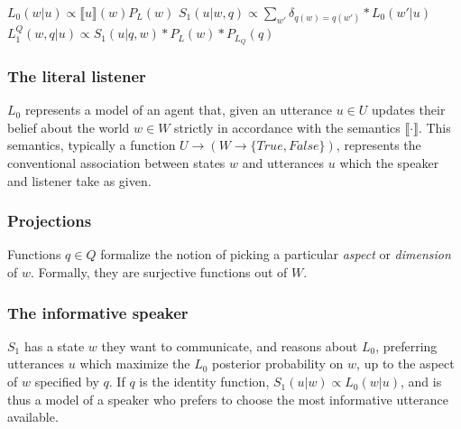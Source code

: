 \documentclass[OpenMind]{stjour}
\newcommand{\Listener}{L}
\newcommand{\QLONE}{\Listener_{{1}}^{{Q}}}
\begin{document}

	\begin{exe}
	\ex $L_0(w\vert u) \propto \llbracket u \rrbracket (w) P_L(w)$ \label{defl0}
	\ex $S_1(u\vert w,q) \propto \sum_{w'} \delta_{q(w)=q(w')} * L_0(w'\vert u)$ \label{defs0}
	\ex $\QLONE(w,q\vert u) \propto S_1(u\vert q,w)*P_L(w) * P_{L_Q}(q)$ \label{defl1}
	\end{exe}

	\subsubsection{The literal listener} $L_0$ represents a model of an agent that, given an utterance $u\in U$ updates their belief about the world $w\in W$ strictly in accordance with the semantics $\llbracket\cdot\rrbracket$. This semantics, typically a function $U\to(W\to\{True, False\})$, represents the conventional association between states $w$ and utterances $u$ which the speaker and listener take as given. 



	\subsubsection{Projections} 
	Functions $q\in Q$ formalize the notion of picking a particular \emph{aspect} or \emph{dimension} of $w$. Formally, they are surjective functions out of $W$.
	

	\subsubsection{The informative speaker} $S_1$ has a state $w$ they want to communicate, and reasons about $L_0$, preferring utterances $u$ which maximize the $L_0$ posterior probability on $w$, up to the aspect of $w$ specified by $q$. If $q$ is the identity function, $S_1(u|w) \propto L_0(w|u)$, and is thus a model of a speaker who prefers to choose the most informative utterance available. 
	
\end{document}
